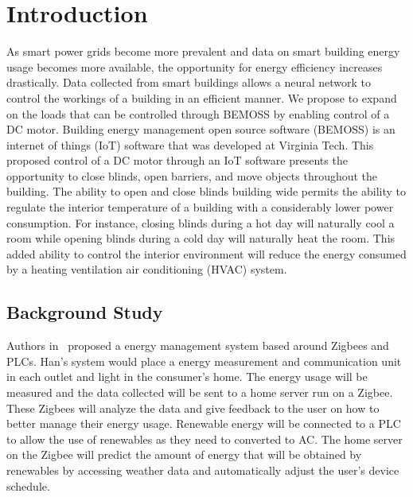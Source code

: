 \chapter{Introduction}
As smart power grids become more prevalent and data on smart building energy usage becomes more available, the opportunity for energy efficiency increases drastically. Data collected from smart buildings allows a neural network to control the workings of a building in an efficient manner. We propose to expand on the loads that can be controlled through BEMOSS by enabling control of a DC motor. Building energy management open source software (BEMOSS) is an internet of things (IoT) software that was developed at Virginia Tech. This proposed control of a DC motor through an IoT software presents the opportunity to close blinds, open barriers, and move objects throughout the building. The ability to open and close blinds building wide permits the ability to regulate the interior temperature of a building with a considerably lower power consumption. For instance, closing blinds during a hot day will naturally cool a room while opening blinds during a cold day will naturally heat the room. This added ability to control the interior environment will reduce the energy consumed by a heating ventilation air conditioning (HVAC) system. 
\section{Background Study}
Authors in~\cite{Han2014} proposed a energy management system based around Zigbees and PLCs. Han's system would place a energy measurement and communication unit in each outlet and light in the consumer's home. The energy usage will be measured and the data collected will be sent to a home server run on a Zigbee. These Zigbees will analyze the data and give feedback to the user on how to better manage their energy usage. Renewable energy will be connected to a PLC to allow the use of renewables as they need to converted to AC. The home server on the Zigbee will predict the amount of energy that will be obtained by renewables by accessing weather data and automatically adjust the user's device schedule.

